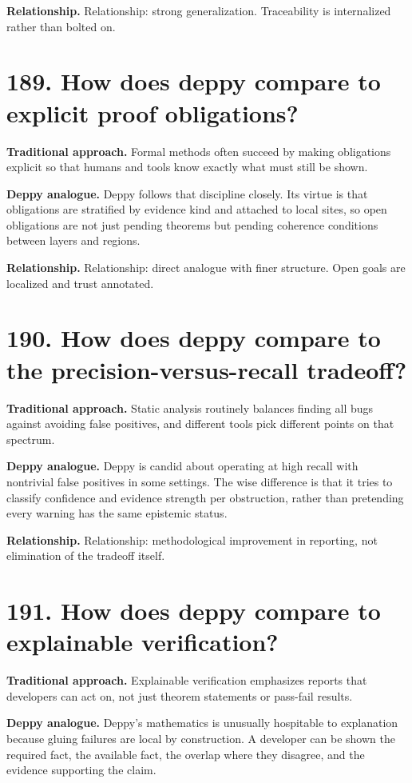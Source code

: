 \documentclass[11pt,openany]{book}
\begin{document}
\textbf{Relationship.} Relationship: strong generalization. Traceability is internalized rather than bolted on.

\section*{189. How does deppy compare to explicit proof obligations?}
\textbf{Traditional approach.} Formal methods often succeed by making obligations explicit so that humans and tools know exactly what must still be shown.

\textbf{Deppy analogue.} Deppy follows that discipline closely. Its virtue is that obligations are stratified by evidence kind and attached to local sites, so open obligations are not just pending theorems but pending coherence conditions between layers and regions.

\textbf{Relationship.} Relationship: direct analogue with finer structure. Open goals are localized and trust annotated.

\section*{190. How does deppy compare to the precision-versus-recall tradeoff?}
\textbf{Traditional approach.} Static analysis routinely balances finding all bugs against avoiding false positives, and different tools pick different points on that spectrum.

\textbf{Deppy analogue.} Deppy is candid about operating at high recall with nontrivial false positives in some settings. The wise difference is that it tries to classify confidence and evidence strength per obstruction, rather than pretending every warning has the same epistemic status.

\textbf{Relationship.} Relationship: methodological improvement in reporting, not elimination of the tradeoff itself.

\section*{191. How does deppy compare to explainable verification?}
\textbf{Traditional approach.} Explainable verification emphasizes reports that developers can act on, not just theorem statements or pass-fail results.

\textbf{Deppy analogue.} Deppy's mathematics is unusually hospitable to explanation because gluing failures are local by construction. A developer can be shown the required fact, the available fact, the overlap where they disagree, and the evidence supporting the claim.
\end{document}
